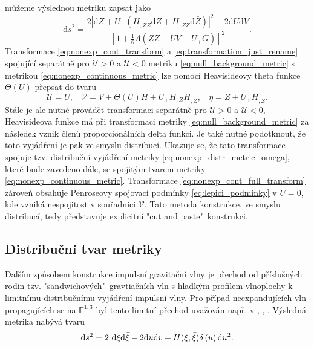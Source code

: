 můžeme výslednou metriku zapsat jako
\begin{equation}
    \label{eq:nonexp_continuous_metric}
    \mathrm{d} s^{2}=\frac{2\left|\mathrm{d} Z+U_-\left(H_{, Z \bar{Z}} 
    \mathrm{d} Z+H_{, \bar{Z} \bar{Z}} \mathrm{d} \bar{Z}\right)\right|^{2}-2 \mathrm{d} U 
    \mathrm{d} V}{\left[1+\frac{1}{6} \Lambda(Z \bar{Z}-U V-U_+ G)\right]^{2}}.
\end{equation}
Transformace \eqref{eq:nonexp_cont_transform} a \eqref{eq:transformation_just_rename} spojující separátně pro $\mathcal{U}>0$ a $\mathcal{U}<0$ metriku \eqref{eq:null_background_metric}
s metrikou \eqref{eq:nonexp_continuous_metric} lze pomocí Heavisideovy theta funkce $\Theta(U)$ přepsat do tvaru 
\begin{equation}
    \label{eq:nonexp_cont_full_transform}
    \mathcal{U}=U,~~~~ \mathcal{V}=V+\Theta(U) H + U_+ H_{,Z}H_{,\bar{Z}},~~~~ \eta=Z+ U_+ H_{,\bar{Z}}.
\end{equation}
Stále je ale nutné provádět transformaci separátně pro $\mathcal{U}>0$ a $\mathcal{U}<0$, Heavisideova funkce
má při transformaci metriky \eqref{eq:null_background_metric} za následek vznik členů proporcionálních delta funkci. Je také nutné podotknout,
že toto vyjádření je pak ve smyslu distribucí.
Ukazuje se, že tato transformace spojuje tzv. distribuční vyjádření metriky \eqref{eq:nonexp_distr_metric_omega}, které bude zavedeno dále,
se spojitým tvarem metriky \eqref{eq:nonexp_continuous_metric}.
Transformace \eqref{eq:nonexp_cont_full_transform} zároveň obsahuje Penroseovy spojovací podmínky \eqref{eq:lepici_podminky} v $U=0$, kde
vzniká nespojitost v souřadnici $\mathcal{V}$. Tato metoda konstrukce, ve smyslu distribucí, tedy představuje explicitní "cut and paste"\ konstrukci.


\subsection{Distribuční tvar metriky}
Dalším způsobem konstrukce impulsní gravitační vlny je přechod od příslušných rodin tzv. "sandwichových"\
gravtiačních vln s hladkým profilem vlnoplochy k limitnímu distribučnímu vyjádření impulsní vlny. Pro případ neexpandujících vln propagujících se
na $\mathbb{E}^{1,3}$ byl tento limitní přechod uvažován např. v \cite{Penrose1968TwistorQuant}, \cite{Podolsky_1998}, \cite{Podolsky_1998_nonexpanding}.
Výsledná metrika nabývá tvaru
\begin{equation}
    \mathrm{d} s^2 = 2~ \mathrm{d} \xi \mathrm{d} \bar{\xi} - 2 \mathrm{d} u \mathrm{d} v + H(\xi, \bar{\xi}) \delta\left( u\right) \mathrm{d} u^2.
\end{equation}

